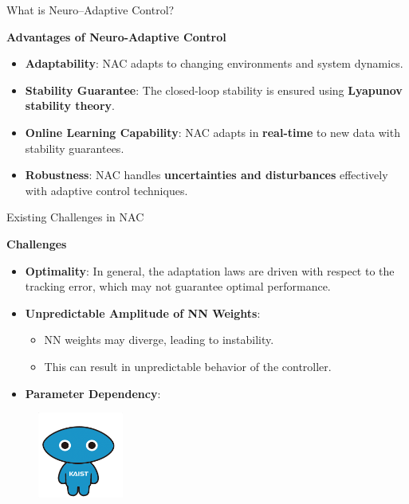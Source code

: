 \documentclass[8pt, aspectratio=169]{beamer}
\begin{document}
\begin{frame}{\insertsubsectionhead}{What is Neuro–Adaptive Control?}

  \textbf{Advantages of Neuro-Adaptive Control}
  \small{
    \begin{itemize}
      \item \textbf{Adaptability}: NAC adapts to changing environments and system dynamics.
      \item \textbf{Stability Guarantee}: The closed-loop stability is ensured using \textbf{Lyapunov stability theory}.
      \item \textbf{Online Learning Capability}: NAC adapts in \textbf{real-time} to new data with stability guarantees.
      \item \textbf{Robustness}: NAC handles \textbf{uncertainties and disturbances} effectively with adaptive control techniques.
    \end{itemize}
  }
  
\end{frame}

\begin{frame}{\insertsubsectionhead}{Existing Challenges in NAC}
  
  \textbf{Challenges}
  \small{
    \begin{itemize}
      \item \textbf{Optimality}: In general, the adaptation laws are driven with respect to the tracking error, which may not guarantee optimal performance.
      \item \textbf{Unpredictable Amplitude of NN Weights}: 
        \begin{itemize}
          \item NN weights may diverge, leading to instability.
          \item This can result in unpredictable behavior of the controller.
        \end{itemize}
      \item \textbf{Parameter Dependency}: 
    \end{itemize}
  }

  \begin{figure}
    \includegraphics[width=0.25\textwidth]{figures/KAIST-hi.png}
  \end{figure}

\end{frame}
\end{document}
